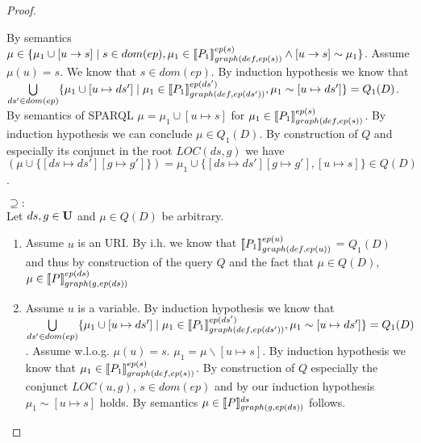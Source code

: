 \begin{proof}
\begin{enumerate}
\begin{enumerate}
					By semantics $\mu \in \{ \mu_1 \cup [u \rightarrow s ] \mid
						s \in dom(ep), \mu_1 \in \llbracket P_1
						\rrbracket^{ep(s)}_{graph(def,ep(s))} \land
					[u \rightarrow s] \sim \mu_1 \}$. Assume $\mu(u) = s$. We know that $s \in dom(ep)$.
					By induction hypothesis we know that 
					$\bigcup\limits_{ds' \in dom(ep)} \{ \mu_1 \cup [u
						\mapsto ds'] \mid \mu_1 \in
						\llbracket P_1\rrbracket^{ep(ds')}_{graph(def,ep(ds'))},
					\mu_1 \sim [u\mapsto ds'] \}  = Q_1(D) $. 
					By semantics of SPARQL $\mu = \mu_1 \cup
					[u \mapsto s]$ for $\mu_1 \in \llbracket P_1\rrbracket^{ep(s)}_{graph(def,ep(s))}$. 
					By induction hypothesis we can conclude
					$\mu \in Q_1(D)$.
					By construction of $Q$ and especially its conjunct in the
					root $LOC(ds,g)$ we have 
					$(\mu \cup \{[ds \mapsto ds'][g \mapsto g']\}) =
					\mu_1 \cup \{[ds \mapsto ds'][g \mapsto g'], [u
					\mapsto s]\} \in Q(D)$. 
			\end{enumerate}



			\bigskip\noindent$\supseteq:$\\
			Let $ds,g \in \mathbf{U}$ and $\mu \in Q(D)$ be arbitrary.
			\begin{enumerate}
				\item Assume $u$ is an URI. 
					By i.h. we know that 
					$\llbracket P_1 \rrbracket^{ep(u)}_{graph(def,ep(u))}$ =
					$Q_1(D)$ and thus by construction of the query $Q$ and the
					fact that $\mu \in Q(D)$, $\mu \in \llbracket P
					\rrbracket^{ep(ds)}_{graph(g,ep(ds))}$
				\item Assume $u$ is a variable. By induction hypothesis we
					know that  $\bigcup\limits_{ds' \in dom(ep)} \{ \mu_1 \cup [u
						\mapsto ds'] \mid \mu_1 \in
						\llbracket P_1\rrbracket^{ep(ds')}_{graph(def,ep(ds'))},
					\mu_1 \sim [u\mapsto ds'] \}  = Q_1(D) $.
					Assume w.l.o.g. $\mu(u) = s$.
					$\mu_1 = \mu \backslash [u \mapsto s]$. By induction hypothesis we know
					that $\mu_1 \in \llbracket P_1 \rrbracket^{ep(s)}_{graph(def,ep(s))}$. By
					construction of $Q$ especially the conjunct $LOC(u,g)$, $s \in dom(ep)$ 
					and by our induction hypothesis $\mu_1 \sim	[u \mapsto s]$ holds.
					By semantics $\mu \in \llbracket P \rrbracket^{ds}_{graph(g,ep(ds))}$ follows.
			\end{enumerate}


\end{enumerate}
\end{proof}
